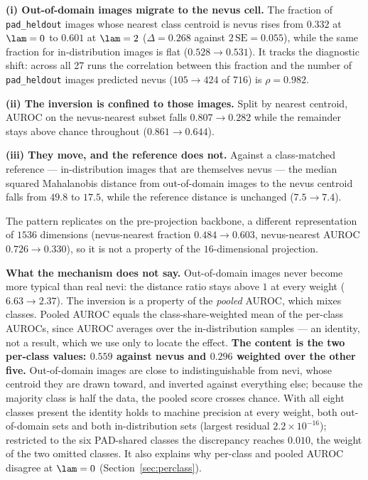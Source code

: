 \textbf{(i) Out-of-domain images migrate to the nevus cell.} The fraction of
\texttt{pad\_heldout} images whose nearest class centroid is nevus rises from $0.332$
at $\lam = 0$ to $0.601$ at $\lam = 2$ ($\Delta = 0.268$ against
$2\,\mathrm{SE} = 0.055$), while the same fraction for in-distribution images is flat
($0.528 \to 0.531$). It tracks the diagnostic shift: across all 27 runs the
correlation between this fraction and the number of \texttt{pad\_heldout} images
predicted nevus ($105 \to 424$ of $716$) is $\rho = 0.982$.

\textbf{(ii) The inversion is confined to those images.} Split by nearest centroid,
AUROC on the nevus-nearest subset falls $0.807 \to 0.282$ while the remainder stays
above chance throughout ($0.861 \to 0.644$).

\textbf{(iii) They move, and the reference does not.} Against a class-matched
reference --- in-distribution images that are themselves nevus --- the median squared
Mahalanobis distance from out-of-domain images to the nevus centroid falls from $49.8$
to $17.5$, while the reference distance is unchanged ($7.5 \to 7.4$).

The pattern replicates on the pre-projection backbone, a different representation of
$1536$ dimensions (nevus-nearest fraction $0.484 \to 0.603$, nevus-nearest AUROC
$0.726 \to 0.330$), so it is not a property of the $16$-dimensional projection.

\textbf{What the mechanism does not say.} Out-of-domain images never become more
typical than real nevi: the distance ratio stays above $1$ at every weight
($6.63 \to 2.37$). The inversion is a property of the \emph{pooled} AUROC, which
mixes classes. Pooled AUROC equals the class-share-weighted mean of the per-class
AUROCs, since AUROC averages over the in-distribution samples --- an identity, not a
result, which we use only to locate the effect. \textbf{The content is the two
per-class values: $0.559$ against nevus and $0.296$ weighted over the other five.}
Out-of-domain images are close to indistinguishable from nevi, whose centroid they are
drawn toward, and inverted against everything else; because the majority class is half
the data, the pooled score crosses chance. With all eight classes present the identity
holds to machine precision at every weight, both out-of-domain sets and both
in-distribution sets (largest residual $2.2 \times 10^{-16}$); restricted to the six
PAD-shared classes the discrepancy reaches $0.010$, the weight of the two omitted
classes. It also explains why per-class and pooled AUROC disagree at $\lam = 0$
(Section~\ref{sec:perclass}).

